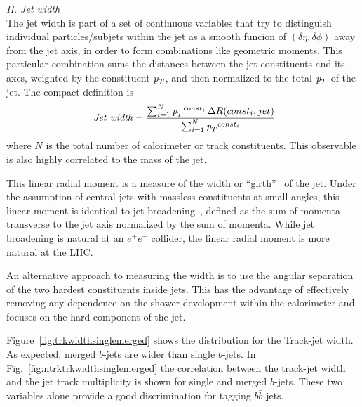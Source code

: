 { \em II. Jet width}
\\[3mm]

The jet width is part of a set of continuous variables that try to distinguish individual particles/subjets within the jet as a smooth funcion of $(\delta \eta, \delta \phi)$ away from the jet axis, in order to form combinations like geometric moments.  This particular combination sums the distances between the jet constituents and its axes, weighted by the constituent ${\emph{p}_{T}}$, and then normalized to the total ${\emph{p}_{T}}$ of the jet. The compact definition is 
%
\begin{equation} 
\mbox{ {\it Jet width}} = \frac{\sum_{i=1}^N {\emph{p}_{T}}^{const_i} \,\Delta R (const_i,jet) }{\sum_{i=1}^N {\emph{p}_{T}}^{const_i} }
\label{eqn:trackjetwidth}
\end{equation} 
%
where $N$ is the total number of calorimeter or track constituents.  This observable is also highly correlated to the mass of the jet.

This linear radial moment is a measure of the width or ``girth''~\cite{PhysRevLett.105.022001} of the jet.  Under the assumption of central jets with massless constituents at small angles, this linear moment is identical to jet broadening~\cite{Catani1992269}, defined as the sum of momenta transverse to the jet axis normalized by the sum of momenta. While jet broadening is natural at an $e^+ e^-$ collider, the linear radial moment is more natural at the LHC.

An alternative approach to measuring the width is to use the angular separation of the two hardest constituents inside jets. This has the advantage of effectively removing any dependence on the shower development within the calorimeter and focuses on the hard component of the jet.




Figure~\ref{fig:trkwidthsinglemerged} shows the distribution for the Track-jet width. As expected, merged $b$-jets are wider than single $b$-jets. In Fig.~\ref{fig:ntrktrkwidthsinglemerged} the correlation between the track-jet width and the jet track multiplicity is shown for single and merged $b$-jets. These two variables alone provide a good discrimination for tagging $b \bar{b}$ jets.

